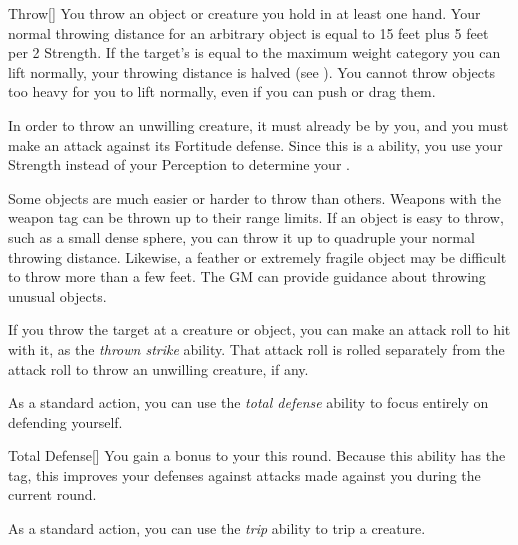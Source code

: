         \begin{activeability}{Throw}[]
            \rankline
            You throw an object or creature you hold in at least one hand.
            Your normal throwing distance for an arbitrary object is equal to 15 feet plus 5 feet per 2 Strength.
            If the target's  is equal to the maximum weight category you can lift normally, your throwing distance is halved (see ).
            You cannot throw objects too heavy for you to lift normally, even if you can push or drag them.

            In order to throw an unwilling creature, it must already be \grappled by you, and you must make an attack against its Fortitude defense.
            Since this is a  ability, you use your Strength instead of your Perception to determine your .

            Some objects are much easier or harder to throw than others.
            Weapons with the  weapon tag can be thrown up to their range limits.
            If an object is easy to throw, such as a small dense sphere, you can throw it up to quadruple your normal throwing distance.
            Likewise, a feather or extremely fragile object may be difficult to throw more than a few feet.
            The GM can provide guidance about throwing unusual objects.

            If you throw the target at a creature or object, you can make an attack roll to hit with it, as the \textit{thrown strike} ability.
            That attack roll is rolled separately from the attack roll to throw an unwilling creature, if any.
        \end{activeability}

        \label{Total Defense} As a standard action, you can use the \textit{total defense} ability to focus entirely on defending yourself.

        \begin{activeability}{Total Defense}[]
            \rankline
            You gain a  bonus to your  this round.
            Because this ability has the  tag, this improves your defenses against attacks made against you during the current round.
        \end{activeability}

        \label{Trip} As a standard action, you can use the \textit{trip} ability to trip a creature.

